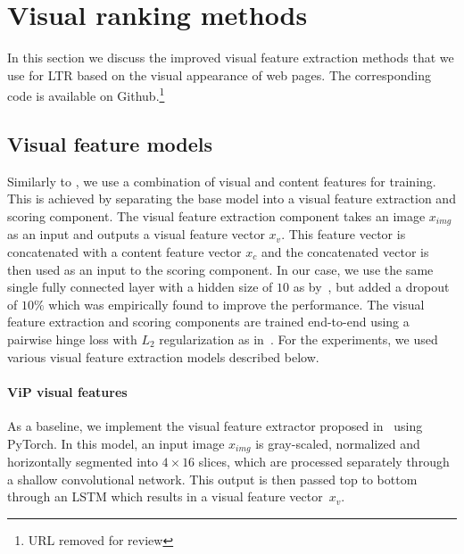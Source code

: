 
\section{Visual ranking methods}
In this section we discuss the improved visual feature extraction methods that we use for \ac{LTR} based on the visual appearance of web pages. The corresponding code is available on Github.\footnote{URL removed for review}

\subsection{Visual feature models}
Similarly to \cite{fan2017learning}, we use a combination of visual and content features for training.
This is achieved by separating the base model into a visual feature extraction and scoring component.
The visual feature extraction component takes an image $x_{img}$ as an input and outputs a visual feature vector $x_{v}$.
This feature vector is concatenated with a content feature vector $x_{c}$ and the concatenated vector is then used as an input to the scoring component.
In our case, we use the same single fully connected layer with a hidden size of $10$ as by~\citep{fan2017learning}, but added a dropout of $10\%$ which was empirically found to improve the performance. 
The visual feature extraction and scoring components are trained end-to-end using a pairwise hinge loss with $L_2$ regularization as in~\cite{fan2017learning}.
For the experiments, we used various visual feature extraction models described below.

\paragraph{ViP visual features}
As a baseline, we implement the visual feature extractor proposed in~\citet{fan2017learning} using PyTorch.
In this model, an input image $x_{img}$ is gray-scaled, normalized and horizontally segmented into $4\times16$ slices, which are processed separately through a shallow convolutional network.
This output is then passed top to bottom through an LSTM which results in a visual feature vector~$x_{v}$. 

